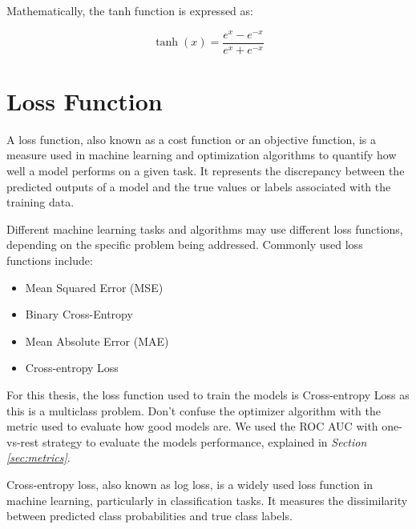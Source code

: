\begin{itemize}
      \centering

      \raggedright
      Mathematically, the tanh function is expressed as:

      \[ \tanh(x) = \frac{{e^x - e^{-x}}}{{e^x + e^{-x}}} \]

\end{itemize}

\section{Loss Function}

A loss function, also known as a cost function or an objective function, is a
measure used in machine learning and optimization algorithms to quantify how
well a model performs on a given task. It represents the discrepancy between
the predicted outputs of a model and the true values or labels associated with
the training data. \newline

Different machine learning tasks and algorithms may use different loss
functions, depending on the specific problem being addressed. Commonly used
loss functions include:

\begin{itemize}
  \item Mean Squared Error (MSE)
  \item Binary Cross-Entropy
  \item Mean Absolute Error (MAE)
  \item Cross-entropy Loss
\end{itemize}

For this thesis, the loss function used to train the models is
Cross-entropy Loss as this is a multiclass problem. Don't confuse the
optimizer algorithm with the metric used to evaluate how good models are. We
used the ROC AUC with one-vs-rest strategy to evaluate the models performance,
explained in \textit{Section \ref{sec:metrics}}. \newline

Cross-entropy loss, also known as log loss, is a widely used loss function in
machine learning, particularly in classification tasks. It measures the
dissimilarity between predicted class probabilities and true class labels.
\newline


